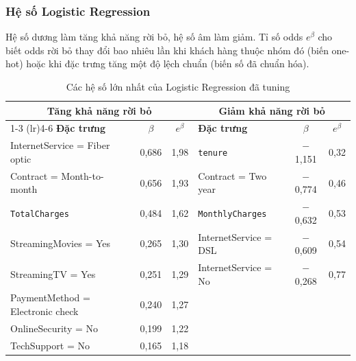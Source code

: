\subsubsection{Hệ số Logistic Regression}
Hệ số dương làm tăng khả năng rời bỏ, hệ số âm làm giảm. Tỉ số odds $e^{\beta}$ cho biết odds rời bỏ thay đổi bao nhiêu lần khi khách hàng thuộc nhóm đó (biến one-hot) hoặc khi đặc trưng tăng một độ lệch chuẩn (biến số đã chuẩn hóa).

\begin{table}[H]
\centering
\small
\begin{tabular}{lcc@{\hskip 1.2cm}lcc}
\toprule
\multicolumn{3}{c}{\textbf{Tăng khả năng rời bỏ}} & \multicolumn{3}{c}{\textbf{Giảm khả năng rời bỏ}} \\
\cmidrule(lr){1-3} \cmidrule(lr){4-6}
\textbf{Đặc trưng} & $\beta$ & $e^{\beta}$ & \textbf{Đặc trưng} & $\beta$ & $e^{\beta}$ \\
\midrule
InternetService = Fiber optic & 0,686 & 1,98 & \texttt{tenure} & $-$1,151 & 0,32 \\
Contract = Month-to-month & 0,656 & 1,93 & Contract = Two year & $-$0,774 & 0,46 \\
\texttt{TotalCharges} & 0,484 & 1,62 & \texttt{MonthlyCharges} & $-$0,632 & 0,53 \\
StreamingMovies = Yes & 0,265 & 1,30 & InternetService = DSL & $-$0,609 & 0,54 \\
StreamingTV = Yes & 0,251 & 1,29 & InternetService = No & $-$0,268 & 0,77 \\
PaymentMethod = Electronic check & 0,240 & 1,27 & & & \\
OnlineSecurity = No & 0,199 & 1,22 & & & \\
TechSupport = No & 0,165 & 1,18 & & & \\
\bottomrule
\end{tabular}
\caption{Các hệ số lớn nhất của Logistic Regression đã tuning}
\end{table}

